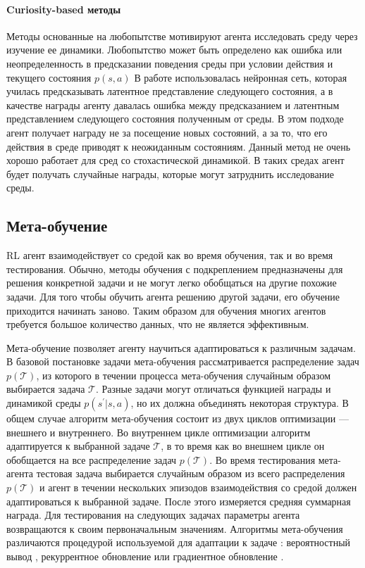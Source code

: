 \paragraph{Curiosity-based методы} Методы основанные на любопытстве мотивируют агента исследовать среду через изучение ее динамики. Любопытство может быть определено как ошибка или неопределенность в предсказании поведения среды при условии действия и текущего состояния $p(s, a)$ \cite{stadie2015incentivizing, pathak2017curiosity} В работе \cite{pathak2017curiosity} использовалась нейронная сеть, которая училась предсказывать латентное представление следующего состояния, а в качестве награды агенту давалась ошибка между предсказанием и латентным представлением следующего состояния полученным от среды. В этом подходе агент получает награду не за посещение новых состояний, а за то, что его действия в среде приводят к неожиданным состояниям. Данный метод не очень хорошо работает для сред со стохастической динамикой. В таких средах агент будет получать случайные награды, которые могут затруднить исследование среды. 


\subsection{Мета-обучение}\label{sec:ch1/sec1/subsec8}

RL агент взаимодействует со средой как во время обучения, так и во время тестирования. Обычно, методы обучения с подкреплением предназначены для решения конкретной задачи и не могут легко обобщаться на другие похожие задачи. Для того чтобы обучить агента решению другой задачи, его обучение приходится начинать заново. Таким образом для обучения многих агентов требуется большое количество данных, что не является эффективным.

Мета-обучение позволяет агенту научиться адаптироваться к различным задачам. В базовой постановке задачи мета-обучения рассматривается распределение задач $p(\mathcal{T})$, из которого в течении процесса мета-обучения случайным образом выбирается задача $\mathcal{T}$. Разные задачи могут отличаться функцией награды и динамикой среды $p(s^{\prime}|s, a)$, но их должна объединять некоторая структура.
В общем случае алгоритм мета-обучения состоит из двух циклов оптимизации --- внешнего и внутреннего. 
Во внутреннем цикле оптимизации алгоритм адаптируется к выбранной задаче $\mathcal{T}$, в то время как во внешнем цикле он обобщается на все распределение задач $p(\mathcal{T})$. Во время тестирования мета-агента тестовая задача выбирается случайным образом из всего распределения $p(\mathcal{T})$ и агент в течении нескольких эпизодов взаимодействия со средой должен адаптироваться к выбранной задаче. После этого измеряется средняя суммарная награда. Для тестирования на следующих задачах параметры агента возвращаются к своим первоначальным значениям. Алгоритмы мета-обучения различаются процедурой используемой для адаптации к задаче \cite{meld}: вероятностный вывод  \cite{PEARL, VariBad},  рекуррентное обновление \cite{meld, RL2} или градиентное обновление \cite{maml}. 

